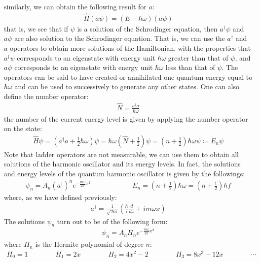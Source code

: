 \documentclass[11pt]{article}
\theoremstyle{break}
\theoremstyle{break}
\begin{document}
similarly, we can obtain the following result for $a$:
\begin{align*}
\hat{H}(a\psi) = (E-\hbar \omega) (a\psi)
\end{align*}
that is, we see that if $\psi$ is a solution of the Schrodinger equation, then $a^\dagger \psi$ and $a\psi$ are also solution to the Schrodinger equation. That is, we can use the $a^{\dagger}$ and $a$ operators to obtain more solutions of the Hamiltonian, with the properties that $a^{\dagger}\psi$ corresponds to an eigenstate with energy unit $\hbar \omega$ greater than that of $\psi$, and $a\psi$ corresponds to an eigenstate with energy unit $\hbar \omega$ less than that of $\psi$. The operators can be said to have created or annihilated one quantum energy equal to $\hbar \omega$ and can be used to successively to generate any other states. One can also define the number operator:
\begin{align*}
\hat{N} = \frac{a^\dagger a}{\hbar \omega}
\end{align*}
the number of the current energy level is given by applying the number operator on the state:
\begin{align*}
\hat{H}\psi = \left(a^\dagger a + \frac{1}{2}\hbar \omega \right) \psi = \hbar \omega \left( \hat{N} + \frac{1}{2}\right) \psi = \left( n + \frac{1}{2}\right) \hbar \omega \psi \coloneqq E_n \psi
\end{align*}
Note that ladder operators are not measurable, we can use them to obtain all solutions of the harmonic oscillator and its energy levels. In fact, the solutions and energy levels of the quantum harmonic oscillator is given by the followings:
\begin{align*}
\psi_n = A_n \left( a^\dagger\right)^n e^{-\frac{m\omega}{2\hbar}x^2} \qquad\qquad\qquad E_n =\left( n+\frac{1}{2}\right) \hbar \omega = \left( n+\frac{1}{2}\right) hf
\end{align*}
where, as we have defined previously:
\begin{align*}
a^\dagger = \frac{1}{\sqrt{2m}}\left( \frac{\hbar}{i}\frac{d}{dx}+im \omega x\right)
\end{align*}
The solutions $\psi_n$ turn out to be of the following form:
\begin{align*}
\psi_n  = A_n H_n e^{-\frac{m\omega}{2\hbar}x^2}
\end{align*}
where $H_n$ is the Hermite polynomial of degree $n$:
\begin{align*}
H_0 = 1 \qquad \qquad H_1 = 2x \qquad\qquad H_2 = 4x^2 - 2 \qquad\qquad H_3 = 8x^3 - 12x \qquad \qquad \cdots
\end{align*}
\end{document}
